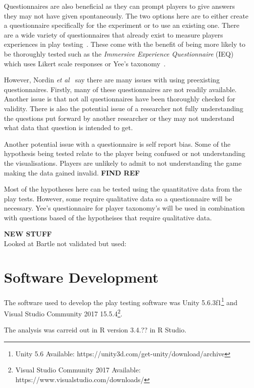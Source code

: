 \documentclass[journal]{IEEEtran}
\begin{document}
Questionnaires are also beneficial as they can prompt players to give answers they may not have given spontaneously. The two options here are to either create a questionnaire specifically for the experiment or to use an existing one. There are a wide variety of questionnaires that already exist to measure players experiences in play testing~\cite{nordin2014,Jennett2008}. These come with the benefit of being more likely to be thoroughly tested such as the \textit{Immersive Experience
Questionnaire} (IEQ) which uses Likert scale responses or Yee's taxonomy~\cite{nordin2014,Jennett2008, Yee2006, Yee2012}.
 
However, Nordin \textit{et al}~\cite{nordin2014} say there are many issues with using preexisting questionnaires. Firstly, many of these questionnaires are not readily available. Another issue is that not all questionnaires have been thoroughly checked for validity. There is also the potential issue of a researcher not fully understanding the questions put forward by another researcher or they may not understand what data that question is intended to get.

Another potential issue with a questionnaire is self report bias. Some of the hypothesis being tested relate to the player being confused or not understanding the visualisations. Players are unlikely to admit to not understanding the game making the data gained invalid. \textbf{FIND REF}

Most of the hypotheses here can be tested using the quantitative data from the play tests. However, some require qualitative data so a questionnaire will be necessary. 
Yee's questionnaire for player taxonomy's will be used in combination with questions based of the hypotheises that require qualitative data.

\textbf{NEW STUFF} \\
Looked at Bartle not validated \cite{Bartle1996} but used: 

\section{Software Development} \label{softdev}
The software used to develop the play testing software was Unity 5.6.3f1\footnote[3]{Unity 5.6 Available: https://unity3d.com/get-unity/download/archive} and Visual Studio Community 2017  15.5.4\footnote[4]{Visual Studio Community 2017 Available: https://www.visualstudio.com/downloads/}.

The analysis was carreid out in R version 3.4.?? in R Studio.
\end{document}
